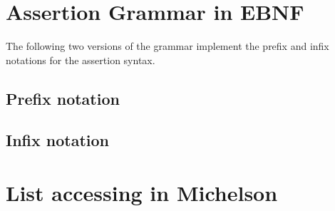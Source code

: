 \appendix
\chapter{Assertion Grammar in EBNF}\label{apx:grammar}
The following two versions of the grammar implement the prefix and infix notations for the assertion syntax. 

\section{Prefix notation}


\section{Infix notation}


\chapter{List accessing in Michelson}\label{apx:nth}


				 
